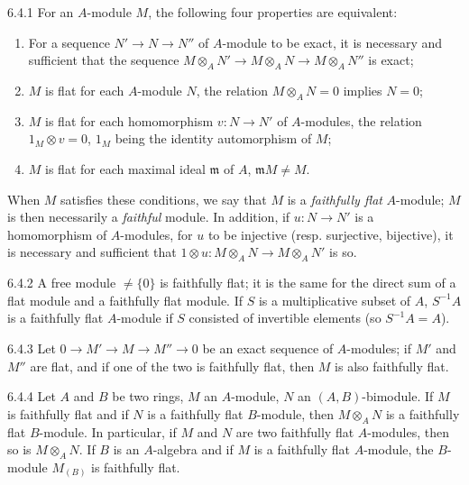 \begin{env}{6.4.1}
\label{env-0.6.4.1}
For an $A$-module $M$, the following four properties are equivalent:
\begin{enumerate}[label=(\alph*)]
  \item For a sequence $N'\to N\to N''$ of $A$-module to be exact, it is necessary and
        sufficient that the sequence $M\otimes_A N'\to M\otimes_A N\to M\otimes_A N''$ is
        exact;
  \item $M$ is flat for each $A$-module $N$, the relation $M\otimes_A N=0$ implies $N=0$;
  \item $M$ is flat for each homomorphism $v:N\to N'$ of $A$-modules, the relation
        $1_M\otimes v=0$, $1_M$ being the identity automorphism of $M$;
  \item $M$ is flat for each maximal ideal $\mathfrak{m}$ of $A$, $\mathfrak{m}M\neq M$.
\end{enumerate}

When $M$ satisfies these conditions, we say that $M$ is a \emph{faithfully flat} $A$-module;
$M$ is then necessarily a \emph{faithful} module. In addition, if $u:N\to N'$ is a
homomorphism of $A$-modules, for $u$ to be injective (resp. surjective, bijective), it is
necessary and sufficient that $1\otimes u:M\otimes_A N\to M\otimes_A N'$ is so.
\end{env}

\begin{env}{6.4.2}
\label{env-0.6.4.2}
A free module $\neq\{0\}$ is faithfully flat; it is the same for the direct sum of a flat
module and a faithfully flat module. If $S$ is a multiplicative subset of $A$, $S^{-1}A$ is
a faithfully flat $A$-module if $S$ consisted of invertible elements (so $S^{-1}A=A$).
\end{env}

\begin{env}{6.4.3}
\label{env-0.6.4.3}
Let $0\to M'\to M\to M''\to 0$ be an exact sequence of $A$-modules; if $M'$ and $M''$ are
flat, and if one of the two is faithfully flat, then $M$ is also faithfully flat.
\end{env}

\begin{env}{6.4.4}
\label{env-0.6.4.4}
Let $A$ and $B$ be two rings, $M$ an $A$-module, $N$ an $(A,B)$-bimodule. If $M$ is
faithfully flat and if $N$ is a faithfully flat $B$-module, then $M\otimes_A N$ is a
faithfully flat $B$-module. In particular, if $M$ and $N$ are two faithfully flat
$A$-modules, then so is $M\otimes_A N$. If $B$ is an $A$-algebra and if $M$ is a faithfully
flat $A$-module, the $B$-module $M_{(B)}$ is faithfully flat.
\end{env}

